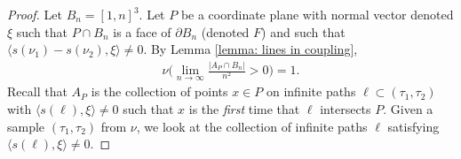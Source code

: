 \documentclass[11pt]{article}
\theoremstyle{remark}
\theoremstyle{definition}
\begin{document}
\begin{proof}

    
    Let $B_n = [1,n]^3$. Let $P$ be a coordinate plane with normal vector denoted $\xi$ such that $P\cap B_n$ is a face of $\partial B_n$ (denoted $F$) and such that $\langle s(\nu_1) - s(\nu_2), \xi \rangle \neq 0$. By Lemma \ref{lemma: lines in coupling}, 
    \begin{align*}
        \nu \bigg( \lim_{n\to \infty} \frac{|A_P\cap B_n|}{n^2} > 0 \bigg) = 1.
    \end{align*}
    Recall that $A_P$ is the collection of points $x\in P$ on infinite paths $\ell \subset (\tau_1,\tau_2)$ with $\langle s(\ell),\xi\rangle \neq 0$ such that $x$ is the \textit{first} time that $\ell$ intersects $P$. Given a sample $(\tau_1,\tau_2)$ from $\nu$, we look at the collection of infinite paths $\ell$ satisfying $\langle s(\ell),\xi\rangle \neq 0$. 
    

\end{proof}
\end{document}
